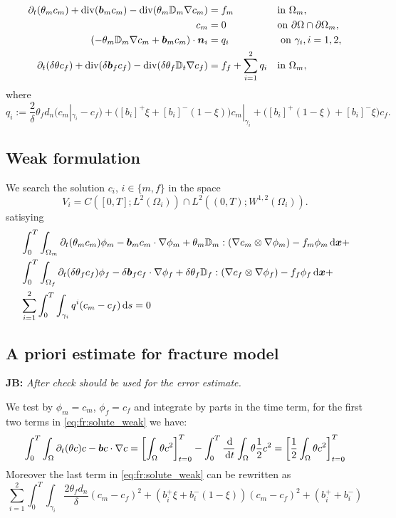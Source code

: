 \documentclass[a4paper]{article}
\def\prtl{\partial}
\def\vc#1{\mathbf{\boldsymbol{#1}}}     %
\def\tn#1{{\mathbb{#1}}}    %
\def\div{{\rm div}}
\def\grad{\nabla}
\def\d {\,{\rm d}}
\newcommand{\note}[2]{{\color{blue} \textbf{ #1:} \textit{#2}}}
\begin{document}
\begin{align}
  \label{eq:fr:solute}
  \prtl_t (\theta_m c_m) + \div(\vc b_m c_m) - \div(\theta_m \tn D_m \grad c_m) &= f_m&&  \text{in } \Omega_m,\\
  \label{eq:fr:Dirichlet}
  c_m &= 0&& \text{on } \partial\Omega\cap\partial\Omega_m,\\
  (- \theta_m \tn D_m\grad c_m + \vc b_m c_m) \cdot \vc n_i &= q_i &&\mbox{ on }\gamma_i,i=1,2,\\ 
  \prtl_t(\delta\theta c_f)  + \div(\delta \vc b_f c_f ) - \div( \delta \theta_f \tn D_t \grad c_f) 
      &= f_f + \sum_{i=1}^2 q_i&&  \text{in } \Omega_m,\\
\end{align}
where 
\[
    q_i:=\frac2\delta \theta_f d_n(c_m|_{\gamma_i} - c_f) 
    +  \big([b_i]^{+}\xi + [b_i]^{-}(1-\xi)\big) c_m|_{\gamma_i}
    +  \big([b_i]^{+}(1-\xi) + [b_i]^{-}\xi\big) c_f.
\]

\subsection{Weak formulation}
We search the solution $c_i$, $i\in \{m,f\}$ in the space 
\[
    V_i =C([0,T]; L^2(\Omega_i) ) \cap L^2( (0,T); W^{1,2}(\Omega_i) ).
\]    
satisying 
\begin{align}
\notag
&\int_0^T \int_{\Omega_m} \prtl_t(\theta_m c_m)\phi_m - \vc b_m c_m \cdot \grad \phi_m + \theta_m \tn D_m : (\grad c_m \otimes \grad \phi_m) - f_m\phi_m \d \vc x+\\
\label{eq:fr:solute_weak}
&\int_0^T \int_{\Omega_f} \prtl_t(\delta\theta_f c_f)\phi_f - \delta \vc b_f c_f \cdot \grad \phi_f + \delta \theta_f \tn D_f : (\grad c_f \otimes \grad \phi_f) - f_f\phi_f \d \vc x+\\
\notag
&\sum_{i=1}^{2} \int_0^T \int_{\gamma_i} q^i (c_m - c_f) \d s = 0
\end{align}


\subsection{A priori estimate for fracture model}
\note{JB}{After check should be used for the error estimate.}

We test by $\phi_m=c_m$, $\phi_f=c_f$ and integrate by parts in the time term, for the first two terms in \eqref{eq:fr:solute_weak} we have:
\[
    \int_0^T \int_{\Omega} \prtl_t(\theta c)c - \vc b c \cdot \grad c = 
    \left[
        \int_{\Omega} \theta c^2
    \right]_{t=0}^{T}
    -\int_0^T \frac{\d}{\d t} \int_{\Omega} \theta \frac12 c^2 =     
    \left[
        \frac12 \int_{\Omega} \theta c^2
    \right]_{t=0}^{T}
\]
Moreover the last term in \eqref{eq:fr:solute_weak} can be rewritten as
\[
   \sum_{i=1}^{2} \int_0^T \int_{\gamma_i} 
   \frac{2\theta_f d_n}{\delta} (c_m - c_f)^2
   + (b_i^+ \xi + b_i^-(1-\xi))(c_m-c_f)^2
   + (b_i^+ + b_i^-)
\]
\end{document}
